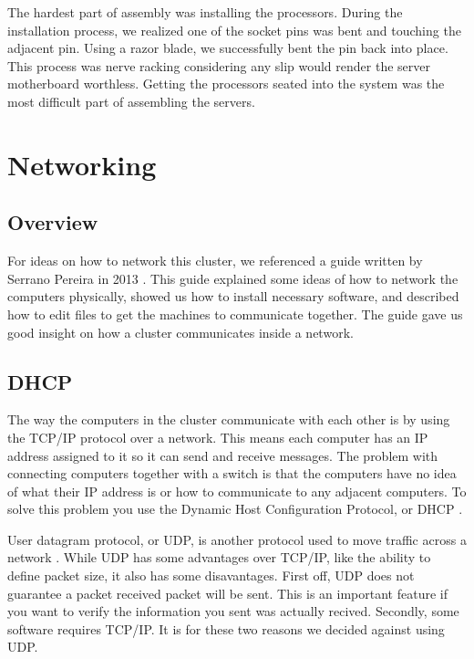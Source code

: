 \documentclass[12pt]{article}
\begin{document}
The hardest part of assembly was installing the processors. During the installation process, we realized one of the socket pins was bent and touching the adjacent pin. Using a razor blade, we successfully bent the pin back into place. This process was nerve racking considering any slip would render the server motherboard worthless. Getting the processors seated into the system was the most difficult part of assembling the servers.

%
%
\section{Networking}

\subsection{Overview}

For ideas on how to network this cluster, we referenced a guide written by Serrano Pereira in 2013 \cite{pereira_2013}. This guide explained some ideas of how to network the computers physically, showed us how to install necessary software, and described how to edit files to get the machines to communicate together. The guide gave us good insight on how a cluster communicates inside a network.

\subsection{DHCP}

The way the computers in the cluster communicate with each other is by using the TCP/IP \cite{ibm}  protocol over a network. This means each computer has an IP address assigned to it so it can send and receive messages. The problem with connecting computers together with a switch is that the computers have no idea of what their IP address is or how to communicate to any adjacent computers. To solve this problem you use the Dynamic Host Configuration Protocol, or DHCP \cite{dhcp}.

User datagram protocol, or UDP, is another protocol used to move traffic across a network \cite{cisco}. While UDP has some advantages over TCP/IP, like the ability to define packet size, it also has some disavantages. First off, UDP does not guarantee a packet received packet will be sent. This is an important feature if you want to verify the information you sent was actually recived. Secondly, some software requires TCP/IP. It is for these two reasons we decided against using UDP. 
\end{document}
